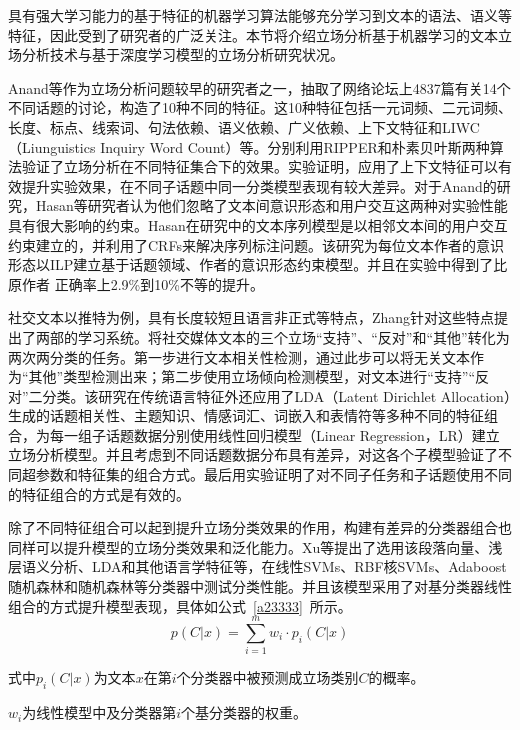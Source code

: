具有强大学习能力的基于特征的机器学习算法能够充分学习到文本的语法、语义等特征，因此受到了研究者的广泛关注。本节将介绍立场分析基于机器学习的文本立场分析技术与基于深度学习模型的立场分析研究状况。



Anand等作为立场分析问题较早的研究者之一，抽取了网络论坛上4837篇有关14个不同话题的讨论，构造了10种不同的特征。这10种特征包括一元词频、二元词频、长度、标点、线索词、句法依赖、语义依赖、广义依赖、上下文特征和LIWC（Liunguistics Inquiry Word Count）等。分别利用RIPPER和朴素贝叶斯两种算法验证了立场分析在不同特征集合下的效果。实验证明，应用了上下文特征可以有效提升实验效果，在不同子话题中同一分类模型表现有较大差异。对于Anand的研究，Hasan等研究者认为他们忽略了文本间意识形态和用户交互这两种对实验性能具有很大影响的约束。Hasan在研究中的文本序列模型是以相邻文本间的用户交互约束建立的，并利用了CRFs来解决序列标注问题。该研究为每位文本作者的意识形态以ILP建立基于话题领域、作者的意识形态约束模型。并且在实验中得到了比原作者	正确率上2.9\%到10\%不等的提升。

社交文本以推特为例，具有长度较短且语言非正式等特点，Zhang针对这些特点提出了两部的学习系统。将社交媒体文本的三个立场“支持”、“反对”和“其他”转化为两次两分类的任务。第一步进行文本相关性检测，通过此步可以将无关文本作为“其他”类型检测出来；第二步使用立场倾向检测模型，对文本进行“支持”“反对”二分类。该研究在传统语言特征外还应用了LDA（Latent Dirichlet Allocation）生成的话题相关性、主题知识、情感词汇、词嵌入和表情符等多种不同的特征组合，为每一组子话题数据分别使用线性回归模型（Linear Regression，LR）建立立场分析模型。并且考虑到不同话题数据分布具有差异，对这各个子模型验证了不同超参数和特征集的组合方式。最后用实验证明了对不同子任务和子话题使用不同的特征组合的方式是有效的。

除了不同特征组合可以起到提升立场分类效果的作用，构建有差异的分类器组合也同样可以提升模型的立场分类效果和泛化能力。Xu等提出了选用该段落向量、浅层语义分析、LDA和其他语言学特征等，在线性SVMs、RBF核SVMs、Adaboost随机森林和随机森林等分类器中测试分类性能。并且该模型采用了对基分类器线性组合的方式提升模型表现，具体如公式~\ref{a23333}~所示。
\begin{equation}\label{a23333}
p(C|x)=\sum_{i=1}^m w_i \cdot p_i(C|x)
\end{equation}

式中$p_i(C|x)$为文本$x$在第$i$个分类器中被预测成立场类别$C$的概率。

$w_i$为线性模型中及分类器第$i$个基分类器的权重。

